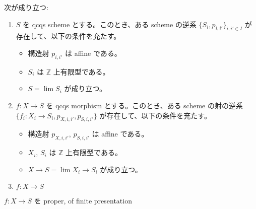 \begin{prop}
  次が成り立つ:
  \begin{enumerate}
    \item $S$ を qcqs scheme とする。このとき、ある scheme の逆系 $\{S_i, p_{i, i'}\}_{i, i'\in I}$ が存在して、以下の条件を充たす。
      \begin{itemize}
        \item 構造射 $p_{i, i'}$ は affine である。
        \item $S_i$ は $\mathbb{Z}$ 上有限型である。
        \item $S = \lim S_i$ が成り立つ。
      \end{itemize}
    \item $f \colon X \to S$ を qcqs morphism とする。このとき、ある scheme の射の逆系 $\{f_i \colon X_i \to S_i, p_{X, i, i'}, p_{S, i, i'}\}$ が存在して、以下の条件を充たす。
      \begin{itemize}
        \item 構造射 $p_{X, i, i'}$, $p_{S, i, i'}$ は affine である。
        \item $X_i$, $S_i$ は $\mathbb{Z}$ 上有限型である。
        \item $X \to S = \lim X_i \to S_i$ が成り立つ。
      \end{itemize}
    \item $f \colon X \to S$
  \end{enumerate}
\end{prop}

\begin{prop}[Stein 分解]
  $f \colon X \to S$ を proper, of finite presentation
\end{prop}